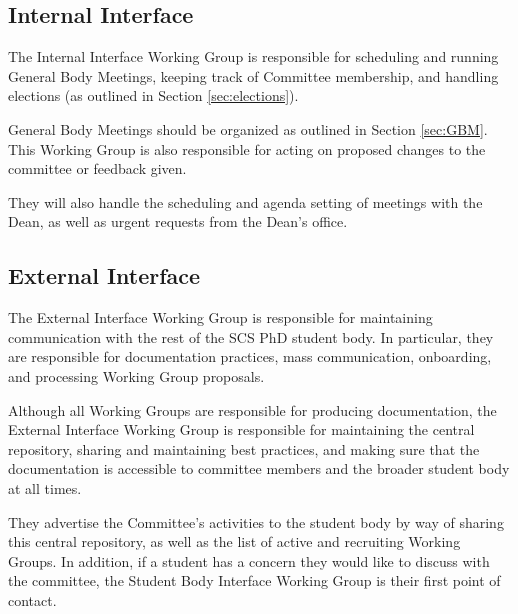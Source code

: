\documentclass{article}
\begin{document}

\subsection{Internal Interface} %

The Internal Interface Working Group is responsible for scheduling and running General Body Meetings, keeping track of Committee membership, and handling elections (as outlined in Section \ref{sec:elections}).

General Body Meetings should be organized as outlined in Section \ref{sec:GBM}. This Working Group is also responsible for acting on proposed changes to the committee or feedback given.

They will also handle the scheduling and agenda setting of meetings with the Dean, as well as urgent requests from the Dean's office.


\subsection{External Interface} %

The External Interface Working Group is responsible for maintaining communication with the rest of the SCS PhD student body. In particular, they are responsible for documentation practices, mass communication, onboarding, and processing Working Group proposals. 

Although all Working Groups are responsible for producing documentation, the External Interface Working Group is responsible for maintaining the central repository, sharing and maintaining best practices, and making sure that the documentation is accessible to committee members and the broader student body at all times. 

They advertise the Committee's activities to the student body by way of sharing this central repository, as well as the list of active and recruiting Working Groups. In addition, if a student has a concern they would like to discuss with the committee, the Student Body Interface Working Group is their first point of contact.
\end{document}
